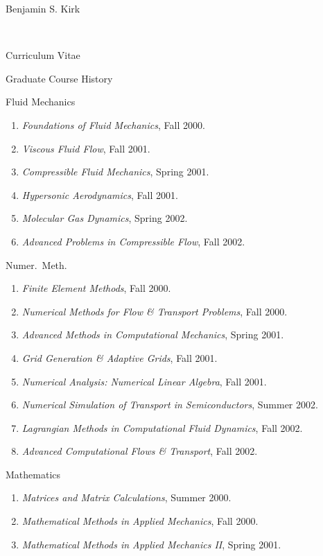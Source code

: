 \documentclass[11pt]{report}
\begin{document}
\begin{cv}{\centerline{Benjamin S. Kirk}\\
    \centerline{\small Curriculum Vitae}}
  \begin{cvlist}{Graduate Course History}
      \item[Fluid Mechanics]
	
	\begin{enumerate}
  	  \item \emph{Foundations of Fluid Mechanics}, Fall 2000.
	  \item \emph{Viscous Fluid Flow}, Fall 2001.
	  \item \emph{Compressible Fluid Mechanics}, Spring 2001.
	  \item \emph{Hypersonic Aerodynamics}, Fall 2001.
	  \item \emph{Molecular Gas Dynamics}, Spring 2002.
	  \item \emph{Advanced Problems in Compressible Flow}, Fall 2002.
	\end{enumerate}

      \vspace{.5em}
      \item[Numer.\ Meth.]
	\begin{enumerate}
	  \item \emph{Finite Element Methods}, Fall 2000.
	  \item \emph{Numerical Methods for Flow \& Transport Problems}, Fall 2000.
	  \item \emph{Advanced Methods in Computational Mechanics}, Spring 2001.
	  \item \emph{Grid Generation \& Adaptive Grids}, Fall 2001.
	  \item \emph{Numerical Analysis: Numerical Linear Algebra}, Fall 2001.
	  \item \emph{Numerical Simulation of Transport in Semiconductors}, Summer 2002.
	  \item \emph{Lagrangian Methods in Computational Fluid Dynamics}, Fall 2002.
	  \item \emph{Advanced Computational Flows \& Transport}, Fall 2002.	  
	\end{enumerate}
	
      \vspace{.5em}
      \item[Mathematics]
	
	\begin{enumerate}
  	  \item \emph{Matrices and Matrix Calculations}, Summer 2000.
	  \item \emph{Mathematical Methods in Applied Mechanics}, Fall 2000.
	  \item \emph{Mathematical Methods in Applied Mechanics II}, Spring 2001.
	\end{enumerate}
	

\end{cvlist}
\end{cv}
\end{document}
